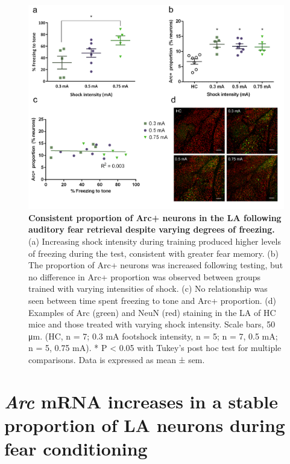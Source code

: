\documentclass[12pt,a4paper,]{report}
\begin{document}
\begin{figure}[htbp]
\centering
\includegraphics{source/figures/figure_2.jpg}
\caption{\textbf{Consistent proportion of Arc+ neurons in the LA
following auditory fear retrieval despite varying degrees of freezing.}
(a) Increasing shock intensity during training produced higher levels of
freezing during the test, consistent with greater fear memory. (b) The
proportion of Arc+ neurons was increased following testing, but no
difference in Arc+ proportion was observed between groups trained with
varying intensities of shock. (c) No relationship was seen between time
spent freezing to tone and Arc+ proportion. (d) Examples of Arc (green)
and NeuN (red) staining in the LA of HC mice and those treated with
varying shock intensity. Scale bars, 50 μm. (HC, n = 7; 0.3 mA footshock
intensity, n = 5; n = 7, 0.5 mA; n = 5, 0.75 mA). * P \textless{} 0.05
with Tukey's post hoc test for multiple comparisons. Data is expressed
as mean ± sem. \label{ref_a_figure}}
\end{figure}

\section{\texorpdfstring{\emph{Arc} mRNA increases in a stable
proportion of LA neurons during fear
conditioning}{Arc mRNA increases in a stable proportion of LA neurons during fear conditioning}}\label{arc-mrna-increases-in-a-stable-proportion-of-la-neurons-during-fear-conditioning}
\end{document}
